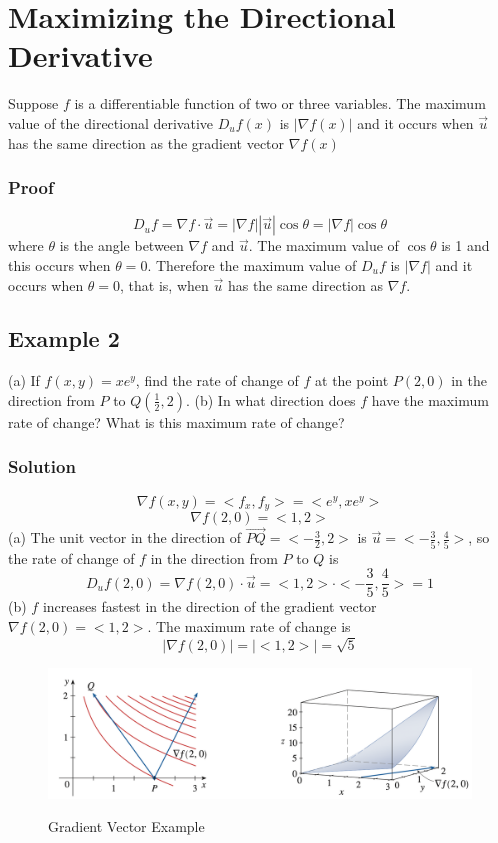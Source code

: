 \section{Maximizing the Directional Derivative}

\begin{theorem}
    Suppose $f$ is a differentiable function of two or three variables. The maximum value of the directional derivative $D_uf(x)$ is $| \nabla f(x)|$ and it occurs when $\vec{u}$ has the same direction as the gradient vector $\nabla f(x)$
\end{theorem}
\subsubsection{Proof}
\begin{equation}
    D_uf=\nabla f \cdot \vec{u}=|\nabla f||\vec{u}|\cos \theta = |\nabla f| \cos \theta
\end{equation}
where $\theta$ is the angle between $\nabla f$ and $\vec{u}$. The maximum value of $\cos \theta$ is 1 and this occurs when $\theta=0$. Therefore the maximum value of $D_uf$ is  $|\nabla f|$ and it occurs when $\theta=0$, that is, when $\vec{u}$ has the same direction as $\nabla f$.

\subsection{Example 2}
(a) If $f(x, y)=xe^y$, find the rate of change of $f$ at the point $P(2, 0)$ in the direction from $P$ to $Q(\frac{1}{2}, 2)$.
(b) In what direction does $f$ have the maximum rate of change? What is this maximum rate of change?

\subsubsection{Solution}
$$
    \nabla f(x, y)=<f_x, f_y>=<e^y, xe^y>
$$
$$
    \nabla f(2, 0)=<1, 2>
$$
(a)
The unit vector in the direction of $\vec{PQ}=<-\frac{3}{2}, 2>$ is $\vec{u}=<-\frac{3}{5}, \frac{4}{5}>$, so the rate of change of $f$ in the direction from $P$ to $Q$ is
$$
    D_uf(2, 0)=\nabla f(2, 0) \cdot \vec{u} = <1, 2> \cdot <-\frac{3}{5}, \frac{4}{5}> = 1
$$ 
(b)
$f$ increases fastest in the direction of the gradient vector $\nabla f(2, 0)=<1, 2>$. The maximum rate of change is
$$
    |\nabla f(2, 0)| = |<1, 2>| = \sqrt{5}
$$
\begin{figure}[h]
    \centering
    \cite{calculus}
    \includegraphics[scale=0.45]{chapter002/figures/fig005}
    \caption{Gradient Vector Example}
    \label{fig:Gradient Vector Example}
\end{figure}

